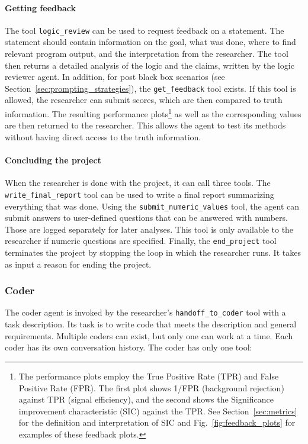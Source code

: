 \documentclass[submission, Phys]{SciPost}
\begin{document}
\paragraph{Getting feedback} The tool \verb|logic_review| can be used to request feedback on a statement. The statement should contain information on the goal, what was done, where to find relevant program output, and the interpretation from the researcher. The tool then returns a detailed analysis of the logic and the claims, written by the logic reviewer agent. In addition, for post black box scenarios (see Section~\ref{sec:prompting_strategies}), the \verb|get_feedback| tool exists. If this tool is allowed, the researcher can submit scores, which are then compared to truth information. The resulting performance plots\footnote{The performance plots employ the True Positive Rate (TPR) and False Positive Rate (FPR). The first plot shows 1/FPR (background rejection) against TPR (signal efficiency), and the second shows the Significance improvement characteristic (SIC) against the TPR. See Section~\ref{sec:metrics} for the definition and interpretation of SIC and Fig.~\ref{fig:feedback_plots} for examples of these feedback plots.} as well as the corresponding values are then returned to the researcher. This allows the agent to test its methods without having direct access to the truth information. 

\paragraph{Concluding the project} When the researcher is done with the project, it can call three tools. The \verb|write_final_report| tool can be used to write a final report summarizing everything that was done. Using the \verb|submit_numeric_values| tool, the agent can submit answers to user-defined questions that can be answered  with numbers. Those are logged separately for later analyses. This tool is only available to the researcher if numeric questions are specified. Finally, the \verb|end_project| tool terminates the project by stopping the loop in which the researcher runs. It takes as input a reason for ending the project.

\subsubsection{Coder}

The coder agent is invoked by the researcher's \verb|handoff_to_coder| tool with a task description. Its task is to write code that meets the description and general requirements. Multiple coders can exist, but only one can work at a time. Each coder has its own conversation history. The coder has only one tool:
\end{document}
